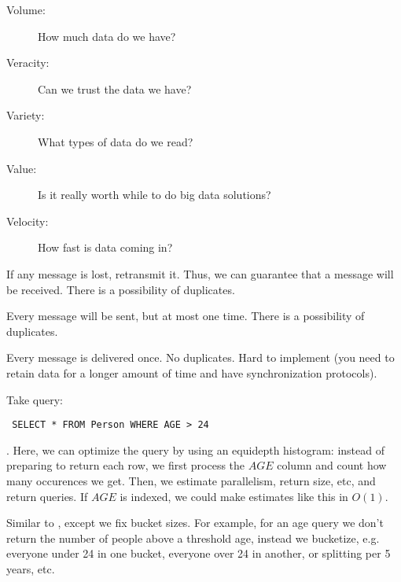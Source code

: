 \begin{definition}\label{def:fiveV}
    \begin{description}
        \item[Volume:] How much data do we have?
        \item[Veracity:] Can we trust the data we have?
        \item[Variety:] What types of data do we read?
        \item[Value:] Is it really worth while to do big data solutions?
        \item[Velocity:] How fast is data coming in?
    \end{description}
\end{definition}

\begin{definition}\label{def:atleastonce}
    If any message is lost, retransmit it. Thus, we can guarantee that a message will be received.
    There is a possibility of duplicates.
\end{definition}

\begin{definition}\label{def:atmostonce}
    Every message will be sent, but at most one time.
    There is a possibility of duplicates.
\end{definition}

\begin{definition}\label{def:exactlyonce}
    Every message is delivered once. No duplicates. Hard to implement (you need to retain data for a longer amount of time and have synchronization protocols).
\end{definition}

\begin{definition}\label{def:equidepthhistogram}
Take query: 
\begin{verbatim} SELECT * FROM Person WHERE AGE > 24 \end{verbatim}.
Here, we can optimize the query by using an equidepth histogram:
instead of preparing to return each row, we first process the $AGE$ column and count 
how many occurences we get. Then, we estimate parallelism, return size, etc, and return queries.
If $AGE$ is indexed, we could make estimates like  this in $O(1)$.
\end{definition}

\begin{definition}
    Similar to , except we fix bucket sizes.
    For example, for an age query we don't return the number of people above a threshold age,
    instead we bucketize, e.g. everyone under 24 in one bucket, everyone over 24 in another,
    or splitting per 5 years, etc.
\end{definition}

